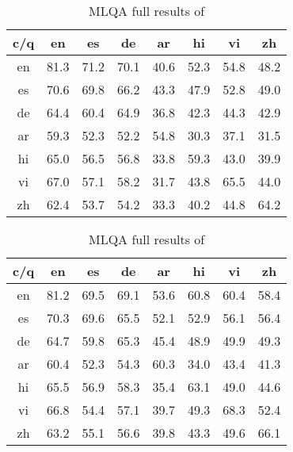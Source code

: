 \documentclass[11pt]{article}
\begin{document}
\begin{table}[h!]
  \small
  \center
  \begin{minipage}[t]{.45\textwidth}
    \begin{center}
      \begin{tabular}{cccccccc} \toprule

      c/q & en & es & de & ar & hi & vi & zh \\ \midrule
      en & 81.3 & 71.2 & 70.1 & 40.6 & 52.3 & 54.8 & 48.2 \\
      es & 70.6 & 69.8 & 66.2 & 43.3 & 47.9 & 52.8 & 49.0 \\
      de & 64.4 & 60.4 & 64.9 & 36.8 & 42.3 & 44.3 & 42.9 \\
      ar & 59.3 & 52.3 & 52.2 & 54.8 & 30.3 & 37.1 & 31.5 \\
      hi & 65.0 & 56.5 & 56.8 & 33.8 & 59.3 & 43.0 & 39.9 \\
      vi & 67.0 & 57.1 & 58.2 & 31.7 & 43.8 & 65.5 & 44.0 \\
      zh & 62.4 & 53.7 & 54.2 & 33.3 & 40.2 & 44.8 & 64.2 \\ \bottomrule

      \end{tabular}
    \end{center}
    \caption{MLQA full results of \xlmr{}\ba{} + training}
    \label{table:mlqa-xlmr-base-train}
  \end{minipage}
\hspace{5mm}
\begin{minipage}[t]{.45\textwidth}
    \begin{center}
      \begin{tabular}{cccccccc} \toprule
        c/q & en & es & de & ar & hi & vi & zh \\ \midrule
        en & 81.2 & 69.5 & 69.1 & 53.6 & 60.8 & 60.4 & 58.4 \\
        es & 70.3 & 69.6 & 65.5 & 52.1 & 52.9 & 56.1 & 56.4 \\
        de & 64.7 & 59.8 & 65.3 & 45.4 & 48.9 & 49.9 & 49.3 \\
        ar & 60.4 & 52.3 & 54.3 & 60.3 & 34.0 & 43.4 & 41.3 \\
        hi & 65.5 & 56.9 & 58.3 & 35.4 & 63.1 & 49.0 & 44.6 \\
        vi & 66.8 & 54.4 & 57.1 & 39.7 & 49.3 & 68.3 & 52.4 \\
        zh & 63.2 & 55.1 & 56.6 & 39.8 & 43.3 & 49.6 & 66.1 \\ \bottomrule
      \end{tabular}
    \end{center}
    \caption{MLQA full results of \mlukeW{}\ba{}}
    \label{table:mlqa-mlukeW-base}
  \end{minipage}
\end{table}
\end{document}
